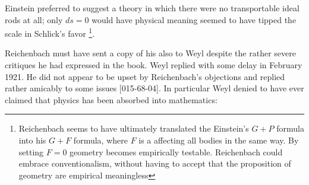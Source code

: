 \documentclass[draft]{article}
\begin{document}
{Einstein preferred to suggest a theory in which there were no transportable ideal rods at all; only $ds=0$ would have physical meaning \citep{Einstein1921c}} seemed to have tipped the scale in Schlick's favor \citep{Reichenbach1921a}\footnote{Reichenbach seems to have ultimately translated the Einstein's $G+P$ formula into his $G + F$ formula, where $F$ is a  affecting all bodies in the same way. By setting $F=0$ geometry becomes empirically testable. Reichenbach could embrace conventionalism, without having to accept that the proposition of geometry are empirical meaningless}.









Reichenbach must have sent a copy of his  \citep{Reichenbach1920a} also to Weyl despite the rather severe critiques he had expressed in the book. Weyl replied with some delay in February 1921. He did  not appear to be upset by Reichenbach's objections and replied rather amicably to some issues  [015-68-04]. In particular Weyl denied to have ever claimed that physics has been absorbed into mathematics:
\end{document}
